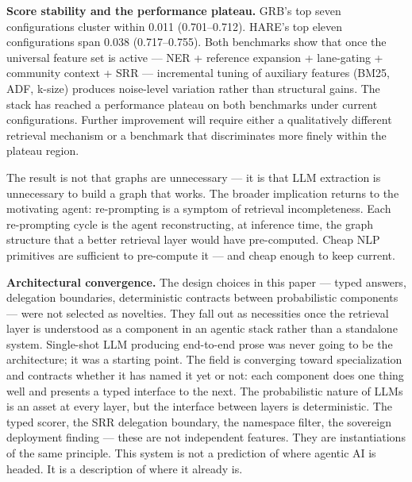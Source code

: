 \documentclass[
]{article}
\begin{document}
\textbf{Score stability and the performance plateau.} GRB's top seven
configurations cluster within 0.011 (0.701--0.712). HARE's top eleven
configurations span 0.038 (0.717--0.755). Both benchmarks show that once
the universal feature set is active --- NER + reference expansion +
lane-gating + community context + SRR --- incremental tuning of
auxiliary features (BM25, ADF, k-size) produces noise-level variation
rather than structural gains. The stack has reached a performance
plateau on both benchmarks under current configurations. Further
improvement will require either a qualitatively different retrieval
mechanism or a benchmark that discriminates more finely within the
plateau region.

The result is not that graphs are unnecessary --- it is that LLM
extraction is unnecessary to build a graph that works. The broader
implication returns to the motivating agent: re-prompting is a symptom
of retrieval incompleteness. Each re-prompting cycle is the agent
reconstructing, at inference time, the graph structure that a better
retrieval layer would have pre-computed. Cheap NLP primitives are
sufficient to pre-compute it --- and cheap enough to keep current.

\textbf{Architectural convergence.} The design choices in this paper ---
typed answers, delegation boundaries, deterministic contracts between
probabilistic components --- were not selected as novelties. They fall
out as necessities once the retrieval layer is understood as a component
in an agentic stack rather than a standalone system. Single-shot LLM
producing end-to-end prose was never going to be the architecture; it
was a starting point. The field is converging toward specialization and
contracts whether it has named it yet or not: each component does one
thing well and presents a typed interface to the next. The probabilistic
nature of LLMs is an asset at every layer, but the interface between
layers is deterministic. The typed scorer, the SRR delegation boundary,
the namespace filter, the sovereign deployment finding --- these are not
independent features. They are instantiations of the same principle.
This system is not a prediction of where agentic AI is headed. It is a
description of where it already is.
\end{document}
